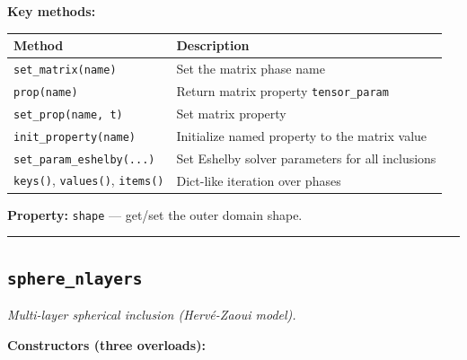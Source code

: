 \documentclass[
  a4paper,
  numbers=noendperiod,
  DIV=12]{scrreprt}
\newcounter{none} %
\begin{document}
\textbf{Key methods:}

{\def\LTcaptype{none} %
\begin{longtable}[]{@{}
  >{\raggedright\arraybackslash}p{}
  >{\raggedright\arraybackslash}p{}@{}}
\toprule\noalign{}
\begin{minipage}[b]{\linewidth}\raggedright
Method
\end{minipage} & \begin{minipage}[b]{\linewidth}\raggedright
Description
\end{minipage} \\
\midrule\noalign{}
\endhead
\bottomrule\noalign{}
\endlastfoot
\texttt{set\_matrix(name)} & Set the matrix phase name \\
\texttt{prop(name)} & Return matrix property \texttt{tensor\_param} \\
\texttt{set\_prop(name,\ t)} & Set matrix property \\
\texttt{init\_property(name)} & Initialize named property to the matrix
value \\
\texttt{set\_param\_eshelby(...)} & Set Eshelby solver parameters for
all inclusions \\
\texttt{keys()}, \texttt{values()}, \texttt{items()} & Dict-like
iteration over phases \\
\end{longtable}
}

\textbf{Property:} \texttt{shape} --- get/set the outer domain shape.

\begin{center}\rule{0.5\linewidth}{0.5pt}\end{center}

\subsection{\texorpdfstring{\texttt{sphere\_nlayers}}{sphere\_nlayers}}\label{api-sphere-nlayers}

\emph{Multi-layer spherical inclusion (Hervé-Zaoui model).}

\textbf{Constructors (three overloads):}
\end{document}
